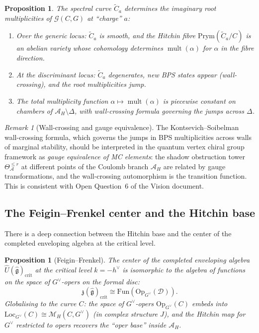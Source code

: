 \documentclass[11pt]{article}
\newtheorem{proposition}[theorem]{Proposition}
\theoremstyle{definition}
\theoremstyle{remark}
\newtheorem{remark}[theorem]{Remark}
\newcommand{\Loc}{\mathrm{Loc}}
\newcommand{\frakg}{\mathfrak{g}}
\newcommand{\cA}{\mathcal{A}}
\newcommand{\cM}{\mathcal{M}}
\newcommand{\Prym}{\mathrm{Prym}}
\DeclareMathOperator{\mult}{mult}
\begin{document}
\begin{proposition}
\label{prop:spectral-bps}
The spectral curve $\widetilde{C}_a$ determines the imaginary root multiplicities of $\mathcal{G}(C, G)$ at ``charge'' $a$:
\begin{enumerate}[label=(\roman*)]
 \item Over the generic locus: $\widetilde{C}_a$ is smooth, and the Hitchin fibre $\Prym(\widetilde{C}_a/C)$ is an abelian variety whose cohomology determines $\mult(\alpha)$ for $\alpha$ in the fibre direction.
 \item At the discriminant locus: $\widetilde{C}_a$ degenerates, new BPS states appear (wall-crossing), and the root multiplicities jump.
 \item The total multiplicity function $\alpha \mapsto \mult(\alpha)$ is piecewise constant on chambers of $\cA_H \setminus \Delta$, with wall-crossing formula governing the jumps across $\Delta$.
\end{enumerate}
\end{proposition}

\begin{remark}[Wall-crossing and gauge equivalence]
\label{rem:wall-crossing}
The Kontsevich--Soibelman wall-crossing formula, which governs the jumps in BPS multiplicities across walls of marginal stability, should be interpreted in the quantum vertex chiral group framework as \emph{gauge equivalence of MC elements}: the shadow obstruction tower $\Theta_{\cA}^{\leq r}$ at different points of the Coulomb branch $\cA_H$ are related by gauge transformations, and the wall-crossing automorphism is the transition function. This is consistent with Open Question~6 of the Vision document.
\end{remark}

\subsection{The Feigin--Frenkel center and the Hitchin base}

There is a deep connection between the Hitchin base and the center of the completed enveloping algebra at the critical level.

\begin{proposition}[Feigin--Frenkel]
\label{prop:ff-center}
The center of the completed enveloping algebra $\widehat{U}(\widehat{\frakg})_{\mathrm{crit}}$ at the critical level $k = -h^\vee$ is isomorphic to the algebra of functions on the space of $G^\vee$-opers on the formal disc:
\[
 \mathfrak{z}(\widehat{\frakg})_{\mathrm{crit}} \cong \mathrm{Fun}(\mathrm{Op}_{G^\vee}(\mathcal{D})).
\]
Globalising to the curve $C$: the space of $G^\vee$-opers $\mathrm{Op}_{G^\vee}(C)$ embeds into $\Loc_{G^\vee}(C) \cong \cM_H(C, G^\vee)$ (in complex structure $J$), and the Hitchin map for $G^\vee$ restricted to opers recovers the ``oper base'' inside $\cA_H$.
\end{proposition}
\end{document}
